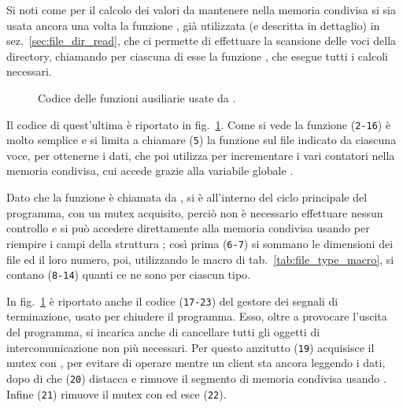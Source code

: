 Si noti come per il calcolo dei valori da mantenere nella memoria condivisa si
sia usata ancora una volta la funzione , già utilizzata (e
descritta in dettaglio) in sez.~\ref{sec:file_dir_read}, che ci permette di
effettuare la scansione delle voci della directory, chiamando per ciascuna di
esse la funzione , che esegue tutti i calcoli necessari.

\begin{figure}[!htbp]
  \footnotesize \centering
  \begin{minipage}[c]{\codesamplewidth}
  \end{minipage} 
  \normalsize 
  \caption{Codice delle funzioni ausiliarie usate da .}
  \label{fig:ipc_dirmonitor_sub}
\end{figure}


Il codice di quest'ultima è riportato in fig.~\ref{fig:ipc_dirmonitor_sub}.
Come si vede la funzione (\texttt{\small 2-16}) è molto semplice e si limita a
chiamare (\texttt{\small 5}) la funzione  sul file indicato da
ciascuna voce, per ottenerne i dati, che poi utilizza per incrementare i vari
contatori nella memoria condivisa, cui accede grazie alla variabile globale
.

Dato che la funzione è chiamata da , si è all'interno del
ciclo principale del programma, con un mutex acquisito, perciò non è
necessario effettuare nessun controllo e si può accedere direttamente alla
memoria condivisa usando  per riempire i campi della struttura
; così prima (\texttt{\small 6-7}) si sommano le dimensioni
dei file ed il loro numero, poi, utilizzando le macro di
tab.~\ref{tab:file_type_macro}, si contano (\texttt{\small 8-14}) quanti ce
ne sono per ciascun tipo.

In fig.~\ref{fig:ipc_dirmonitor_sub} è riportato anche il codice
(\texttt{\small 17-23}) del gestore dei segnali di terminazione, usato per
chiudere il programma. Esso, oltre a provocare l'uscita del programma, si
incarica anche di cancellare tutti gli oggetti di intercomunicazione non più
necessari.  Per questo anzitutto (\texttt{\small 19}) acquisisce il mutex con
, per evitare di operare mentre un client sta ancora leggendo
i dati, dopo di che (\texttt{\small 20}) distacca e rimuove il segmento di
memoria condivisa usando .  Infine (\texttt{\small 21})
rimuove il mutex con  ed esce (\texttt{\small 22}).

